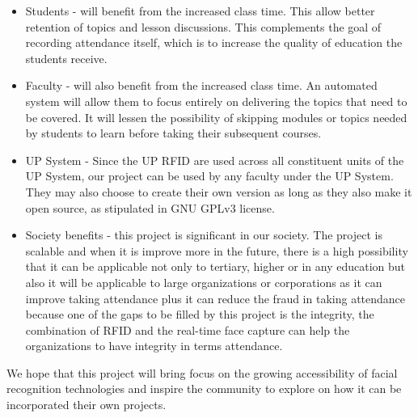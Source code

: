 	\begin{itemize}
		\item Students - will benefit from the increased class time. This allow better retention of topics and lesson discussions. This complements the goal of recording attendance itself, which is to increase the quality of education the students receive.
	\end{itemize}
	\begin{itemize}
		\item Faculty - will also benefit from the increased class time. An automated system will allow them to focus entirely on delivering the topics that need to be covered. It will lessen the possibility of skipping modules or topics needed by students to learn before taking their subsequent courses. 
	\end{itemize}
	\begin{itemize}
		\item UP System - Since the UP RFID are used across all constituent units of the UP System, our project can be used by any faculty under the UP System. They may also choose to create their own version as long as they also make it open source, as stipulated in GNU GPLv3 license.
	\end{itemize}
	\begin{itemize}
		\item Society benefits - this project is significant in our society. The project is scalable and when it is improve more in the future, there is a high possibility that it can be applicable not only to tertiary, higher or in any education but also it will be applicable to large organizations or corporations as it can improve taking attendance plus it can reduce the fraud in taking attendance because one of the gaps to be filled by this project is the integrity, the combination of RFID and the real-time face capture can help the organizations to have integrity in terms attendance. 
		
	\end{itemize}
	
	
	We hope that this project will bring focus on the growing accessibility of facial recognition technologies and inspire the community to explore on how it can be incorporated their own projects.


